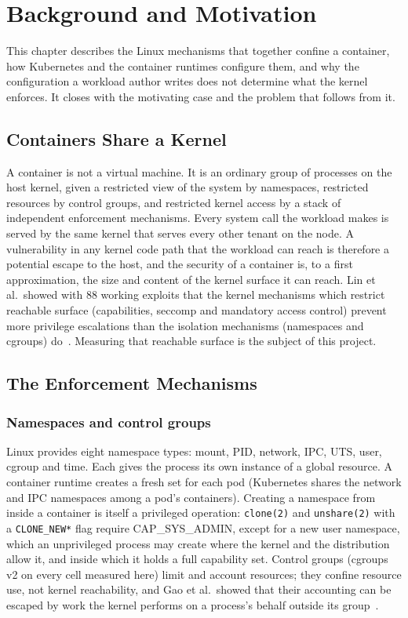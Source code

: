 \chapter{Background and Motivation}
\label{ch:background}

This chapter describes the Linux mechanisms that together confine a container, how Kubernetes and the container runtimes configure them, and why the configuration a workload author writes does not determine what the kernel enforces. It closes with the motivating case and the problem that follows from it.

\section{Containers Share a Kernel}

A container is not a virtual machine. It is an ordinary group of processes on the host kernel, given a restricted view of the system by namespaces, restricted resources by control groups, and restricted kernel access by a stack of independent enforcement mechanisms. Every system call the workload makes is served by the same kernel that serves every other tenant on the node. A vulnerability in any kernel code path that the workload can reach is therefore a potential escape to the host, and the security of a container is, to a first approximation, the size and content of the kernel surface it can reach. Lin et al.\ showed with 88 working exploits that the kernel mechanisms which restrict reachable surface (capabilities, seccomp and mandatory access control) prevent more privilege escalations than the isolation mechanisms (namespaces and cgroups) do~\cite{lin2018}. Measuring that reachable surface is the subject of this project.

\section{The Enforcement Mechanisms}

\subsection{Namespaces and control groups}
Linux provides eight namespace types: mount, PID, network, IPC, UTS, user, cgroup and time. Each gives the process its own instance of a global resource. A container runtime creates a fresh set for each pod (Kubernetes shares the network and IPC namespaces among a pod's containers). Creating a namespace from inside a container is itself a privileged operation: \texttt{clone(2)} and \texttt{unshare(2)} with a \texttt{CLONE\_NEW*} flag require CAP\_SYS\_ADMIN, except for a new user namespace, which an unprivileged process may create where the kernel and the distribution allow it, and inside which it holds a full capability set. Control groups (cgroups v2 on every cell measured here) limit and account resources; they confine resource use, not kernel reachability, and Gao et al.\ showed that their accounting can be escaped by work the kernel performs on a process's behalf outside its group~\cite{gao2019houdini}.

